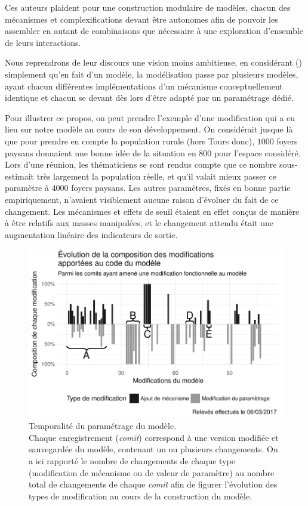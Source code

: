 \documentclass[12pt, a4paper, oneside]{book}
\begin{document}
	Ces auteurs plaident pour une construction modulaire de modèles, chacun des mécanismes et complexifications devant être autonomes afin de pouvoir les assembler en autant de combinaisons que nécessaire à une exploration d'ensemble de leurs interactions.
	
	Nous reprendrons de leur discours une vision moins ambitieuse, en considérant () simplement qu'en fait d'un modèle, la modélisation passe par plusieurs modèles, ayant chacun différentes implémentations d'un mécanisme conceptuellement identique et chacun se devant dès lors d'être adapté par un paramétrage dédié.
	
	Pour illustrer ce propos, on peut prendre l'exemple d'une modification qui a eu lieu sur notre modèle au cours de son développement. On considérait jusque là que pour prendre en compte la population rurale (hors Tours donc), $1000$ foyers paysans donnaient une bonne idée de la situation en 800 pour l'espace considéré.
	Lors d'une réunion, les thématiciens se sont rendus compte que ce nombre sous-estimait très largement la population réelle, et qu'il valait mieux passer ce paramètre à $4000$ foyers paysans.
	Les autres paramètres, fixés en bonne partie empiriquement, n'avaient visiblement aucune raison d'évoluer du fait de ce changement. Les mécanismes  et effets de seuil étaient en effet conçus de manière à être relatifs aux masses manipulées, et le changement attendu était une augmentation linéaire des indicateurs de sortie.
	
	\begin{figure}[H]
		\includegraphics[width = \linewidth]{img/plotComits.pdf}
		\caption{Temporalité du paramétrage du modèle.\\
			Chaque \og enregistrement\fg{} (\textit{comit}) correspond à une version modifiée et sauvegardée du modèle, contenant un ou plusieurs changements. On a ici rapporté le nombre de changements de chaque type (modification de mécanisme ou de valeur de paramètre) au nombre total de changements de chaque \textit{comit} afin de figurer l'évolution des types de modification au cours de la construction du modèle.}
		\label{fig:comits-periodes}
	\end{figure}
	
\end{document}
